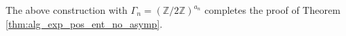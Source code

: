 \documentclass[oneside,english]{amsart}
\theoremstyle{definition}
\newcommand{\act}[2]{{#1} \curvearrowright {#2}}
\begin{document}
The above construction with  $\Gamma_n = (\mathbb{Z}/2\mathbb{Z})^{a_n}$ completes the proof %
 of Theorem \ref{thm:alg_exp_pos_ent_no_asymp}.

%
%
\end{document}
